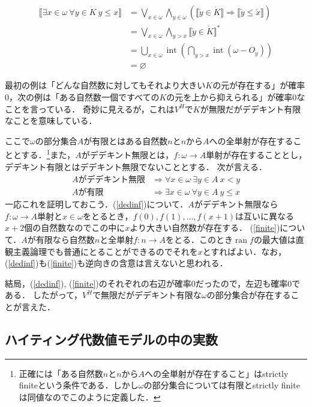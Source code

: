 \documentclass[uplatex,dvipdfmx]{jsarticle}
\newcommand{\range}{\operatorname{ran}}
\newcommand{\intr}{\operatorname{int}}
\renewcommand\emptyset{\varnothing}
\newcommand{\truth}[1] {\llbracket #1 \rrbracket}
\theoremstyle{definition}
\begin{document}
\begin{align*}
\truth{\exists x \in \omega\ \forall y \in \dot{K}\ y \le x} &= \bigvee_{x \in \omega} \bigwedge_{y \in \omega} (\truth{\check{y} \in \dot{K}} \Rightarrow \truth{\check{y} \le \check{x}}) \\
 &= \bigvee_{x \in \omega} \bigwedge_{y > x} \truth{\check{y} \in \dot{K}}^* \\
 &= \bigcup_{x \in \omega} \intr (\bigcap_{y > x} \intr(\omega - O_y)) \\
 &= \emptyset
\end{align*}

最初の例は「どんな自然数に対してもそれより大きい$K$の元が存在する」が確率$0$，次の例は「ある自然数一個ですべての$K$の元を上から抑えられる」が確率$0$なことを言っている．
奇妙に見えるが，これは$V^H$で$\dot{K}$が無限だがデデキント有限なことを意味している．

ここで$\omega$の部分集合$A$が有限とはある自然数$n$と$n$から$A$への全単射が存在することとする．\footnote{正確には「ある自然数$n$と$n$から$A$への全単射が存在すること」はstrictly finiteという条件である．しかし$\omega$の部分集合については有限とstrictly finiteは同値なのでこのように定義した．}また，$A$がデデキント無限とは，$f: \omega \to A$単射が存在することとし，デデキント有限とはデデキント無限でないこととする．
次が言える．
\begin{align}
\text{$A$がデデキント無限} &\Rightarrow \forall x \in \omega\ \exists y \in A\ x < y \label{dedinf} \\
\text{$A$が有限} &\Rightarrow \exists x \in \omega\ \forall y \in A\ y \le x \label{finite}
\end{align}
一応これを証明しておこう．(\ref{dedinf})について．$A$がデデキント無限なら$f: \omega \to A$単射と$x \in \omega$をとるとき，$f(0), f(1), \dots, f(x+1)$は互いに異なる$x+2$個の自然数なのでこの中に$x$より大きい自然数が存在する．
(\ref{finite})について．$A$が有限なら自然数$n$と全単射$f: n \to A$をとる．このとき$\range f$の最大値は直観主義論理でも普通にとることができるのでそれを$x$とすればよい．なお，(\ref{dedinf})も(\ref{finite})も逆向きの含意は言えないと思われる．

結局，(\ref{dedinf}), (\ref{finite})のそれぞれの右辺が確率$0$だったので，左辺も確率$0$である．
したがって，$V^H$で無限だがデデキント有限な$\omega$の部分集合が存在することが言えた．

\subsection{ハイティング代数値モデルの中の実数}
\end{document}
